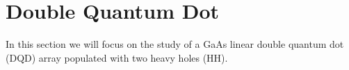 
\chapter{Double Quantum Dot} %

\label{sec:DQD} %


In this section we will focus on the study of a GaAs linear double quantum dot (DQD) array populated with two heavy holes (HH). 

